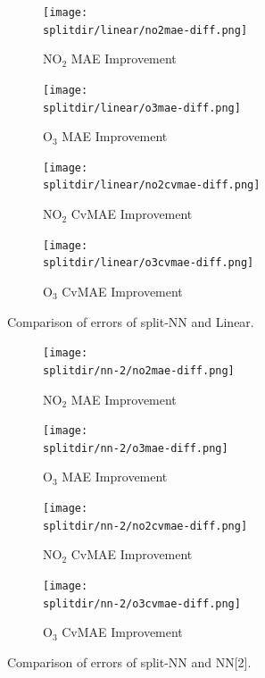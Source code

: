 \documentclass[journal abbreviation, manuscript]{copernicus}
\newcommand{\textus}[1]{$_{\text{#1}}$}
\begin{document}
\begin{figure}[H]
\begin{subfigure}{0.49\textwidth}
\texttt{[image: \\splitdir/linear/no2mae-diff.png]}
\caption{NO\textus{2} MAE Improvement}
\end{subfigure}
\begin{subfigure}{0.49\textwidth}
\texttt{[image: \\splitdir/linear/o3mae-diff.png]}
\caption{O\textus{3} MAE Improvement}
\end{subfigure}
\begin{subfigure}{0.49\textwidth}
\texttt{[image: \\splitdir/linear/no2cvmae-diff.png]}
\caption{NO\textus{2} CvMAE Improvement}
\end{subfigure}
\begin{subfigure}{0.49\textwidth}
\texttt{[image: \\splitdir/linear/o3cvmae-diff.png]}
\caption{O\textus{3} CvMAE Improvement}
\end{subfigure}
\caption{Comparison of errors of split-NN and Linear.}
\end{figure}

\begin{figure}[H]
\begin{subfigure}{0.49\textwidth}
\texttt{[image: \\splitdir/nn-2/no2mae-diff.png]}
\caption{NO\textus{2} MAE Improvement}
\end{subfigure}
\begin{subfigure}{0.49\textwidth}
\texttt{[image: \\splitdir/nn-2/o3mae-diff.png]}
\caption{O\textus{3} MAE Improvement}
\end{subfigure}
\begin{subfigure}{0.49\textwidth}
\texttt{[image: \\splitdir/nn-2/no2cvmae-diff.png]}
\caption{NO\textus{2} CvMAE Improvement}
\end{subfigure}
\begin{subfigure}{0.49\textwidth}
\texttt{[image: \\splitdir/nn-2/o3cvmae-diff.png]}
\caption{O\textus{3} CvMAE Improvement}
\end{subfigure}
\caption{Comparison of errors of split-NN and NN[2].}
\end{figure}
\end{document}
